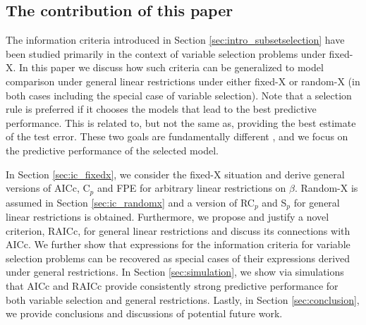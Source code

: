 \subsection{The contribution of this paper}
The information criteria introduced in Section \ref{sec:intro_subsetselection} have been studied primarily in the context of variable selection problems under fixed-X. In this paper we discuss how such criteria can be generalized to model comparison under general linear restrictions under either fixed-X or random-X (in both cases including the special case of variable selection). Note that a selection rule is preferred if it chooses the models that lead to the best predictive performance. This is related to, but not the same as, providing the best estimate of the test error. These two goals are fundamentally different \citep[see, e.g.,][Section 7]{hastie2009elements}, and we focus on the predictive performance of the selected model.

In Section \ref{sec:ic_fixedx}, we consider the fixed-X situation and derive general versions of AICc, C$_p$ and FPE for arbitrary linear restrictions on $\beta$. Random-X is assumed in Section \ref{sec:ic_randomx} and a version of RC$_p$ and S$_p$ for general linear restrictions is obtained. Furthermore, we propose and justify a novel criterion, RAICc, for general linear restrictions and discuss its connections with AICc. We further show that expressions for the information criteria for variable selection problems can be recovered as special cases of their expressions derived under general restrictions. In Section \ref{sec:simulation}, we show via simulations that AICc and RAICc provide consistently strong predictive performance for both variable selection and general restrictions. Lastly, in Section \ref{sec:conclusion}, we provide conclusions and discussions of potential future work.

